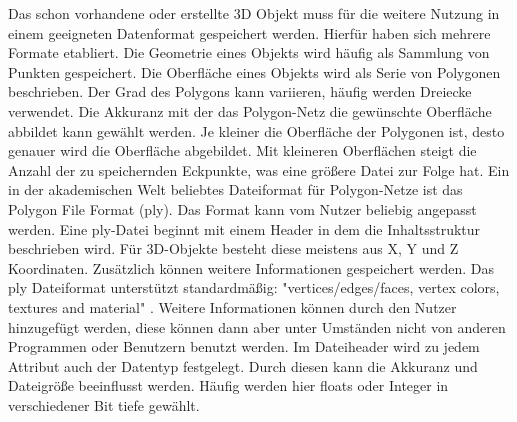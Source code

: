 Das schon vorhandene oder erstellte 3D Objekt muss für die weitere Nutzung
in einem geeigneten Datenformat gespeichert werden. Hierfür haben sich mehrere
Formate etabliert. Die Geometrie eines Objekts wird häufig als Sammlung von Punkten 
gespeichert. Die Oberfläche eines Objekts wird als Serie von Polygonen beschrieben. 
Der Grad des Polygons kann variieren, häufig werden Dreiecke verwendet. Die Akkuranz
mit der das Polygon-Netz die gewünschte Oberfläche abbildet kann gewählt werden. 
Je kleiner die Oberfläche der Polygonen ist, desto genauer wird die Oberfläche 
abgebildet. Mit kleineren Oberflächen steigt die Anzahl der zu speichernden 
Eckpunkte, was eine größere Datei zur Folge hat.
Ein in der akademischen Welt beliebtes Dateiformat für Polygon-Netze ist das 
Polygon File Format (ply).\cite{KentonMchenry.2008}
Das Format kann vom Nutzer beliebig angepasst werden. Eine ply-Datei beginnt mit 
einem Header in dem die Inhaltsstruktur beschrieben wird. 
Für 3D-Objekte besteht diese meistens aus X, Y und Z Koordinaten. 
Zusätzlich können weitere Informationen gespeichert werden. Das ply Dateiformat 
unterstützt standardmäßig: "vertices/edges/faces, vertex colors, textures and
material" \cite{KentonMchenry.2008}. Weitere Informationen können durch den Nutzer 
hinzugefügt werden, 
diese können dann aber unter Umständen nicht von anderen Programmen oder Benutzern
benutzt werden.
Im Dateiheader wird zu jedem Attribut auch der Datentyp festgelegt. Durch diesen 
kann die Akkuranz und Dateigröße beeinflusst werden. Häufig werden hier floats oder
Integer in verschiedener Bit tiefe gewählt.

